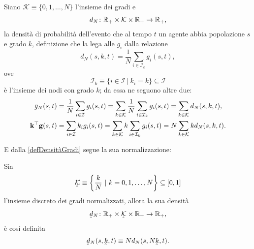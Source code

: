       \begin{dfn}
        \label{defDensitàGradi}
        Siano \(\mathcal K\equiv\{0,1,\ldots,N\}\) l'insieme dei gradi e 
        \[
          d_N\colon\mathbb R_+\times\mathcal K\times\mathbb R_+\to\mathbb R_+,
        \]
        la densità di probabilità dell'evento che al tempo \(t\) un agente abbia popolazione \(s\) e grado \(k\), definizione che la lega alle \(g_i\) dalla relazione
        \[
          d_N(s,k,t)=\frac1N\sum_{i\in\mathcal I_k}g_i(s,t),
        \]
        ove
        \begin{equation}
          \label{eqInsiemeNodiGradok}
          \mathcal I_k\equiv\{i\in\mathcal I\ |\ k_i=k\}\subseteq\mathcal I
        \end{equation}
        è l'insieme dei nodi con grado \(k\); da essa ne seguono altre due:
        \begin{align}
          \bar g_N(s,t)
          &=\frac1N\sum_{i\in\mathcal I}g_i(s,t)
          =\sum_{k\in\mathcal K}\frac1N\sum_{i\in\mathcal I_k}g_i(s,t)
          =\sum_{k\in\mathcal K}d_N(s,k,t),\label{eqDensitàGradiMarginale}\\
          \mathbf k^\top\mathbf g(s,t)
          &=\sum_{i\in\mathcal I}k_ig_i(s,t)
          =\sum_{k\in\mathcal K}k\sum_{i\in\mathcal I_k}g_i(s,t)
          =N\sum_{k\in\mathcal K}kd_N(s,k,t).\notag
        \end{align}
      \end{dfn}

      E dalla \cref{defDensitàGradi} segue la sua normalizzazione:

      \begin{dfn}
        \label{defDensitàGradiNormalizzata}
        Sia
        \[
          \underhat{\mathcal K}\equiv
          \left\{\frac kN\ |\ k=0,1,\ldots,N\right\}
          \subseteq[0,1]
        \]
        l'insieme discreto dei gradi normalizzati, allora la sua densità
        \[
          \underhat d_N\colon\RPlus\times\underhat{\mathcal K}\times\RPlus\to\RPlus,
        \]
        è cosí definita
        \begin{equation}
          \label{eqDensitàGradiNormalizzati}
          \underhat d_N(s,\underhat k,t)\equiv Nd_N(s,N\underhat k,t).
        \end{equation}
      \end{dfn}

